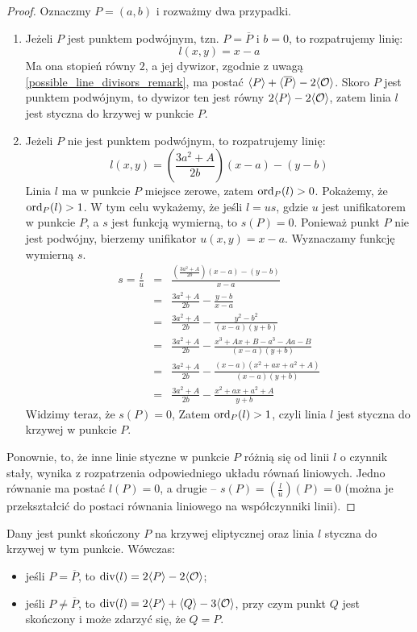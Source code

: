 \begin{proof}
Oznaczmy $P = (a, b)$ i rozważmy dwa przypadki.
\begin{enumerate}
\item
Jeżeli $P$ jest punktem podwójnym, tzn. $P = \overline{P}$ i $b = 0$,
to rozpatrujemy linię:
\begin{equation}
l(x, y) = x - a
\end{equation}
Ma ona stopień równy $2$,
a jej dywizor, zgodnie z uwagą \ref{possible_line_divisors_remark},
ma postać $\langle P\rangle + \langle\overline{P}\rangle - 2\langle\mathcal{O}\rangle$.
Skoro $P$ jest punktem podwójnym, to dywizor ten jest równy
$2\langle P\rangle - 2\langle\mathcal{O}\rangle$,
zatem linia $l$ jest styczna do krzywej w punkcie $P$.
\item
Jeżeli $P$ nie jest punktem podwójnym,
to rozpatrujemy linię:
\begin{equation}
l(x, y) = \left(\frac{3a^2 + A}{2b}\right)(x - a) - (y - b)
\end{equation}
Linia $l$ ma w punkcie $P$ miejsce zerowe, zatem $\operatorname{ord}_P(l) > 0$.
Pokażemy, że $\operatorname{ord}_P(l) > 1$.
W tym celu wykażemy, że jeśli $l = us$,
gdzie $u$ jest unifikatorem w punkcie $P$,
a $s$ jest funkcją wymierną,
to $s(P) = 0$.
Ponieważ punkt $P$ nie jest podwójny,
bierzemy unifikator $u(x, y) = x - a$.
Wyznaczamy funkcję wymierną $s$.
\begin{eqnarray*}
s = \frac{l}{u}
& = & \frac{\left(\frac{3a^2+A}{2b}\right)(x-a) - (y-b)}{x-a} \\
& = & \frac{3a^2+A}{2b} - \frac{y-b}{x-a} \\
& = & \frac{3a^2+A}{2b} - \frac{y^2-b^2}{(x-a)(y+b)} \\
& = & \frac{3a^2+A}{2b} - \frac{x^3+Ax+B - a^3-Aa-B}{(x-a)(y+b)} \\
& = & \frac{3a^2+A}{2b} - \frac{(x-a)(x^2+ax+a^2+A)}{(x-a)(y+b)} \\
& = & \frac{3a^2+A}{2b} - \frac{x^2+ax+a^2+A}{y+b}
\end{eqnarray*}
Widzimy teraz, że $s(P) = 0$,
Zatem $\operatorname{ord}_P(l) > 1$, czyli linia $l$ jest styczna do krzywej w punkcie $P$.
\end{enumerate}
Ponownie, to, że inne linie styczne w punkcie $P$ różnią się od linii $l$
o czynnik stały, wynika z rozpatrzenia odpowiedniego układu równań liniowych.
Jedno równanie ma postać $l(P) = 0$, a drugie --
$s(P) = (\frac{l}{u})(P) = 0$
(można je przekształcić do postaci równania liniowego na współczynniki linii).
\end{proof}

\begin{theorem}
Dany jest punkt skończony $P$ na krzywej eliptycznej
oraz linia $l$ styczna do krzywej w tym punkcie.
Wówczas:
\begin{itemize}
\item jeśli $P = \overline{P}$,
to $\operatorname{div}(l) = 2\langle P\rangle - 2\langle\mathcal{O}\rangle$;
\item jeśli $P \neq \overline{P}$,
to $\operatorname{div}(l) = 2\langle P\rangle + \langle Q\rangle - 3\langle\mathcal{O}\rangle$,
przy czym punkt $Q$ jest skończony
i może zdarzyć się, że $Q = P$.
\end{itemize}
\end{theorem}

